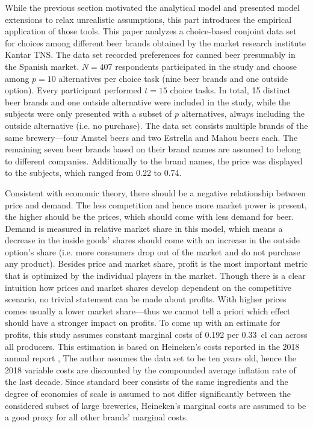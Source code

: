 \documentclass[12pt,a4paper]{article}
\begin{document}
While the previous section motivated the analytical model and presented model extensions to relax unrealistic assumptions,
this part introduces the empirical application of those tools.
This paper analyzes a choice-based conjoint data set for choices among different beer brands obtained by the market research institute Kantar TNS.
The data set recorded preferences for canned beer presumably in the Spanish market.
 $N=407$ respondents participated in the study and choose among $p=10$ alternatives per choice task (nine beer brands and one outside option).
Every participant performed $t=15$ choice tasks. In total, 15 distinct beer brands and one outside alternative were included in the study,
while the subjects were only presented with a subset of $p$ alternatives, always including the outside alternative (i.e. no purchase).
The data set consists multiple brands of the same brewery---four Amstel beers and two Estrella and Mahou beers each.
The remaining seven beer brands based on their brand names are assumed to belong to different companies.
Additionally to the brand names, the price was displayed to the subjects, which ranged from 0.22 to 0.74\text{ \euro }.

Consistent with economic theory, there should be a negative relationship between price and demand.
The less competition and hence more market power is present, the higher should be the prices, which should come with less demand for beer.
Demand is measured in relative market share in this model, which means a decrease in the inside goods' shares should come with an increase in the outside option's share (i.e. more consumers drop out of the market and do not purchase any product).
Besides price and market share, profit is the most important metric that is optimized by the individual players in the market.
Though there is a clear intuition how prices and market shares develop dependent on the competitive scenario, no trivial statement can be made about profits.
With higher prices comes usually a lower market share---thus we cannot tell a priori which effect should have a stronger impact on profits.
To come up with an estimate for profits, this study assumes constant marginal costs of 0.192\text{ \euro } per 0.33~cl can across all producers.
This estimation is based on Heineken's costs reported in the 2018 annual report \citep{heinekenHeinekenAnnualReport2019}, 
The author assumes the data set to be ten years old, hence the 2018 variable costs are discounted by the compounded average inflation rate of the last decade.
Since standard beer consists of the same ingredients and the degree of economies of scale is assumed to not differ significantly between the considered subset of large breweries, Heineken's marginal costs are assumed to be a good proxy for all other brands' marginal costs.
\end{document}
